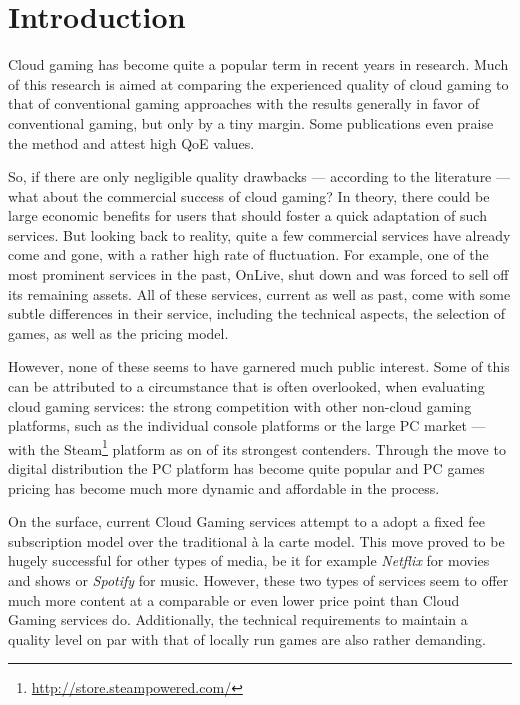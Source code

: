 

\section{Introduction}

Cloud gaming has become quite a popular term in recent years in 
research. Much of this research is aimed at comparing the experienced 
quality of cloud gaming to that of conventional gaming approaches with 
the results generally in favor of conventional gaming, but only by a 
tiny margin. Some publications even praise the method and attest high 
\gls{QoE} values.

So, if there are only negligible quality drawbacks --- according to the 
literature --- what about the commercial success of cloud gaming? In 
theory, there could be large economic benefits for users that should 
foster a quick adaptation of such services. But looking back to 
reality, quite a few commercial services have already come and gone, 
with a rather high rate of fluctuation. For example, one of the most 
prominent services in the past, OnLive, shut down and was forced to 
sell off its remaining assets. All of these services, current as well 
as past, come with some subtle differences in their service, including 
the technical aspects, the selection of games, as well as the pricing 
model.

However, none of these seems to have garnered much public interest. 
Some of this can be attributed to a circumstance that is often 
overlooked, when evaluating cloud gaming services: the strong 
competition with other non-cloud gaming platforms, such as the 
individual console platforms or the large PC market --- with the 
Steam\footnote{\url{http://store.steampowered.com/}} platform as on of 
its strongest contenders. Through the move to digital distribution the 
PC platform has become quite popular and PC games pricing has become 
much more dynamic and affordable in the process.

On the surface, current Cloud Gaming services attempt to a adopt a 
fixed fee subscription model over the traditional à la carte model. 
This move proved to be hugely successful for other types of media, be 
it for example \textit{Netflix} for movies and shows or 
\textit{Spotify} for music. However, these two types of services seem 
to offer much more content at a comparable or even lower price point 
than Cloud Gaming services do. Additionally, the technical requirements 
to maintain a quality level on par with that of locally run games are 
also rather demanding.


